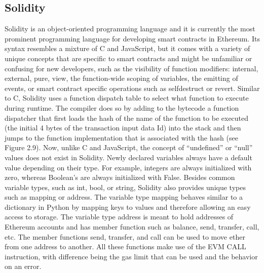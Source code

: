     \subsection{Solidity}
        Solidity is an object-oriented programming language and it is currently the most prominent programming language for developing smart contracts in Ethereum.
        Its syntax resembles a mixture of C and JavaScript, but it comes with a variety of unique concepts that are specific to smart contracts and might be unfamiliar or confusing for new developers, such as the visibility of function modifiers: internal, external, pure, view, the function-wide scoping of variables, the emitting of events, or smart contract specific operations such as selfdestruct or revert.
        Similar to C, Solidity uses a function dispatch table to select what function to execute during runtime.
        The compiler does so by adding to the bytecode a function dispatcher that first loads the hash of the name of the function to be executed (the initial 4 bytes of the transaction input data Id) into the stack and then jumps to the function implementation that is associated with the hash (see Figure 2.9).
        Now, unlike C and JavaScript, the concept of “undefined” or “null” values does not exist in Solidity.
        Newly declared variables always have a default value depending on their type.
        For example, integers are always initialized with zero, whereas Boolean's are always initialized with False.
        Besides common variable types, such as int, bool, or string, Solidity also provides unique types such as mapping or address.
        The variable type mapping behaves similar to a dictionary in Python by mapping keys to values and therefore allowing an easy access to storage.
        The variable type address is meant to hold addresses of Ethereum accounts and has member function such as balance, send, transfer, call, etc.
        The member functions send, transfer, and call can be used to move ether from one address to another.
        All these functions make use of the EVM CALL instruction, with difference being the gas limit that can be used and the behavior on an error.
        
